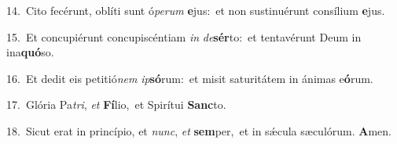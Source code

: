 {\numbfont\textcolor{\numbcolor}{14.}}~Cito fecérunt, oblíti sunt ó\-\textit{pe}\-\textit{rum} \textbf{e}\-jus:~\star et non sustinuérunt consílium \textbf{e}\-jus.\par
{\numbfont\textcolor{\numbcolor}{15.}}~Et concupiérunt concupiscéntiam \textit{in} \textit{de}\-\textbf{sér}to:~\star et tentavérunt Deum in ina\-\textbf{quó}\-so.\par
{\numbfont\textcolor{\numbcolor}{16.}}~Et dedit eis petitió\textit{nem} \textit{ip}\-\textbf{só}rum:~\star et misit saturitátem in ánimas e\-\textbf{ó}\-rum.\par
{\numbfont\textcolor{\numbcolor}{17.}}~Glória Pa\-\textit{tri}\-, \textit{et} \textbf{Fí}\-lio,~\star et Spirítui \textbf{Sanc}\-to.\par
{\numbfont\textcolor{\numbcolor}{18.}}~Sicut erat in princípio, et \textit{nunc}\-, \textit{et} \textbf{sem}\-per,~\star et in sǽcula sæculórum. \textbf{A}\-men.\par
